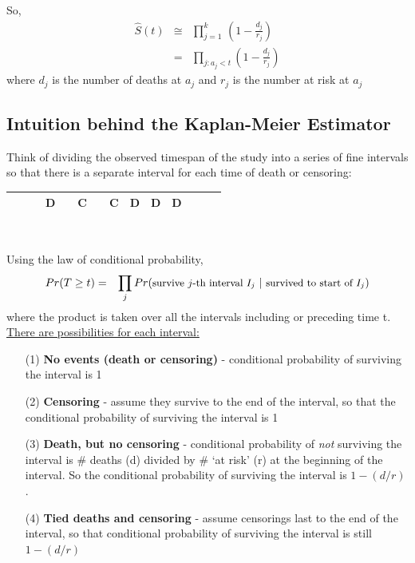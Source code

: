 \documentclass[11pt,slidesonly,semrot,portrait,palatino]{book}
\begin{document}
So,
\begin{eqnarray*}
\hat{S}(t)
& \cong &  \prod_{j=1}^k \, \left(1-\frac{d_j}{r_j}\right) \\[1ex]
& = & \prod_{j:a_j<t}\left(1-\frac{d_j}{r_j}\right)
\end{eqnarray*}
where $d_j$ is the number of deaths at $a_j$ and $r_j$ is the number at risk at $a_j$
\subsection{Intuition behind the Kaplan-Meier Estimator}

Think of dividing the observed timespan of the study into
a series of fine intervals so that there is a separate
interval for each time of death or censoring:\\
\begin{center}
\begin{tabular}{l|p{.2in}|p{.2in}|p{.2in}
 |p{.2in}|p{.2in}|p{.2in}|p{.3in}|p{.2in}|p{.2in}|p{.2in}
 |p{.2in}|p{.2in}|p{.2in}}
  &   &  & D & & C & & C & D & D & D \\
  \hline
  \end{tabular}
  ~\\[2ex]
  \end{center}
Using the law of conditional probability,
 \begin{eqnarray*}
Pr(T \ge t) & = &
\prod_j Pr(\mbox{\small survive $j$-th interval $I_j$}~|
~\mbox{\small survived to start of $I_j$})
\end{eqnarray*}
where the product is taken over all the  intervals including or preceding time t.
\\[2ex]
\underline{There are possibilities for each interval:}
\begin{itemize}
     \item[(1)]  {\bf No events (death or censoring)} - conditional
     probability of surviving the interval is 1
     \item[(2)]  {\bf Censoring} - assume they survive to the
     end of the interval, so that the conditional
     probability of surviving the interval is 1
     \item[(3)]  {\bf Death, but no censoring}  - conditional
     probability of {\em not} surviving the interval is \# deaths (d)
     divided by \# `at risk' (r) at the beginning of the
     interval. So the conditional probability of surviving the
     interval is $1-(d/r)$.
     \item[(4)]  {\bf Tied deaths and censoring} -
         assume censorings last
     to the end of the interval, so that conditional
     probability of surviving the interval is still $1-(d/r)$
     \end{itemize}
\end{document}
